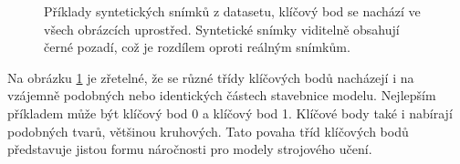 \begin{figure}[H]
\hspace{\hspacesize}%
\hspace{\hspacesize}%
\subfloat{%
  \hspace{\imagewidth}
}

\caption[Příklady syntetických snímků z datasetu]{Příklady syntetických snímků z datasetu, klíčový bod se nachází ve všech obrázcích uprostřed. Syntetické snímky viditelně obsahují černé pozadí, což je rozdílem oproti reálným snímkům. }
\label{fig:synthetic_images}
\end{figure}

Na obrázku \ref{fig:synthetic_images} je zřetelné, že se různé třídy klíčových bodů nacházejí i na vzájemně podobných nebo identických částech stavebnice modelu. Nejlepším příkladem může být klíčový bod 0 a klíčový bod 1. Klíčové body také i nabírají podobných tvarů, většinou kruhových. Tato povaha tříd klíčových bodů představuje jistou formu náročnosti pro modely strojového učení.

\endinput